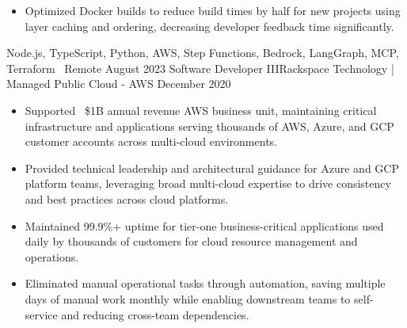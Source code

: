 \begin{experiences}
{\begin{itemize}
                              and
                              solution across all regions, creating reusable
                              Terraform modules and comprehensive documentation
                              that enabled rapid adoption across multiple teams,
                              centralizing security alerting and compliance
                              monitoring organization-wide.
                        \item Optimized Docker builds to reduce build times by
                              half for new projects using layer caching and
                              ordering, decreasing developer feedback time
                              significantly.
                        \fi
                      \end{itemize}
                    }
                    {Node.js, TypeScript, Python, AWS, Step Functions, Bedrock, LangGraph, MCP, Terraform}
                    {\faHome\ Remote}
  \emptySeparator
  \experience
    {August 2023}   {Software Developer III}{Rackspace Technology | Managed Public Cloud - AWS}
    {December 2020} {
                      \begin{itemize}
                        \item Supported ~\$1B annual revenue AWS business unit,
                              maintaining critical infrastructure and applications
                              serving thousands of AWS, Azure, and GCP customer accounts
                              across multi-cloud environments.
                        \item Provided technical leadership and architectural guidance
                              for Azure and GCP platform teams, leveraging broad
                              multi-cloud expertise to drive consistency and best
                              practices across cloud platforms.
                        \item Maintained 99.9\%+ uptime for tier-one business-critical
                              applications used daily by thousands of customers for
                              cloud resource management and operations.
                        \item Eliminated manual operational tasks through automation,
                              saving multiple days of manual work monthly while
                              enabling downstream teams to self-service and reducing
                              cross-team dependencies.

\end{itemize}}
\end{experiences}

